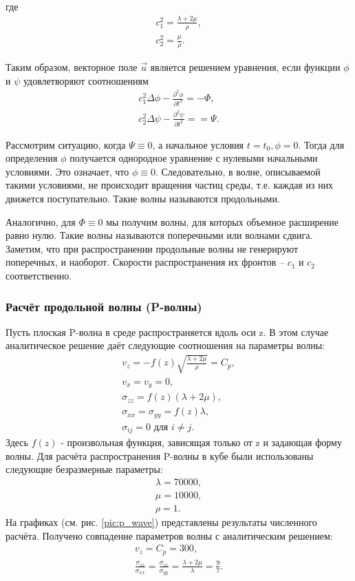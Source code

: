 где 
\begin{eqnarray}
c_1^2 = \frac{\lambda+2\mu}{\rho}, \nonumber\\
c_2^2 = \frac{\mu}{\rho}.
\end{eqnarray}

Таким образом, векторное поле $\vec{u}$ является решением уравнения, если функции $\phi$ и $\psi$ удовлетворяют соотношениям
\begin{eqnarray}
c_1^2\Delta\phi - \frac{\partial^2 \phi}{\partial t^2} = -\Phi, \\
c_2^2\Delta\psi - \frac{\partial^2 \psi}{\partial t^2} = =\Psi.
\end{eqnarray}

Рассмотрим ситуацию, когда $\Psi \equiv 0$, а начальное условия $t = t_0, \phi = 0$. Тогда для определения $\phi$ получается однородное уравнение с нулевыми начальными условиями. Это означает, что $\phi \equiv 0$. Следовательно, в волне, описываемой такими условиями, не происходит вращения частиц среды, т.е. каждая из них движется поступательно. Такие волны называются продольными.

Аналогично, для $\Phi \equiv 0$ мы получим волны, для которых объемное расширение равно нулю. Такие волны называются поперечными или волнами сдвига. Заметим, что при распространении продольные волны не генерируют поперечных, и наоборот. Скорости распространения их фронтов -- $c_1$ и $c_2$ соответственно.


\subsubsection{Расчёт продольной волны (P-волны)}
Пусть плоская P-волна в среде распространяется вдоль оси z. В этом случае аналитическое решение даёт следующие соотношения на параметры волны:
\begin{eqnarray}
v_z=-f(z)\sqrt{\frac{\lambda+2\mu}{\rho}}=C_p, \nonumber\\
v_x=v_y=0, \nonumber\\
\sigma_{zz}=f(z)(\lambda+2\mu), \nonumber\\
\sigma_{xx}=\sigma_{yy}=f(z)\lambda, \nonumber\\
\sigma_{ij}=0 \textrm{ для } i \neq j.
\end{eqnarray}
Здесь $f(z)$ - произвольная функция, зависящая только от z и задающая форму волны.
Для расчёта распространения P-волны в кубе были использованы следующие безразмерные параметры: 
\begin{eqnarray}
\lambda=70000, \nonumber\\
\mu=10000, \nonumber\\
\rho=1.
\end{eqnarray}
На графиках (см. рис. \ref{pic:p_wave}) представлены результаты численного расчёта. Получено совпадение параметров волны с аналитическим решением:
\begin{eqnarray}
v_z=C_p=300, \nonumber\\
\frac{\sigma_{zz}}{\sigma_{xx}}=\frac{\sigma_{zz}}{\sigma_{yy}}=\frac{\lambda+2\mu}{\lambda}=\frac{9}{7}.
\end{eqnarray}


